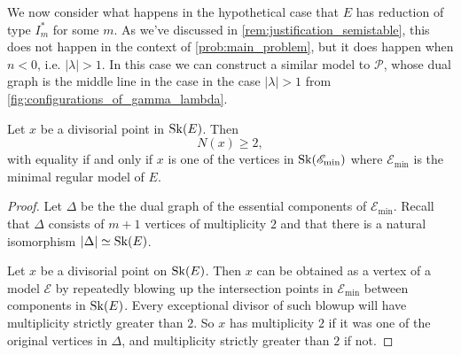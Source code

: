 We now consider what happens in the hypothetical case that $E$ has reduction of type $I_m^*$ for some $m$. 
As we've discussed in \cref{rem:justification_semistable}, this does not happen in the context of \cref{prob:main_problem}, but it does happen when $n < 0$, i.e. $|\lambda| > 1$.  
In this case we can construct a similar model to $\mathscr P$, whose dual graph is the middle line in the case in the case $|\lambda| > 1$ from \cref{fig:configurations_of_gamma_lambda}. 


\begin{lemma}\label{lem:divisorial_points_Is}
	Let $x$ be a divisorial point in $\operatorname{Sk}(E)$. 
	Then  \[
		N(x) \ge 2
	,\] 
	with equality if and only if $x$ is one of the vertices in $\operatorname{Sk}(\mathscr E_\text{min} )$ where $\mathscr E_\text{min} $ is the minimal regular model of $E$. 
\end{lemma}
\begin{proof}
	Let $\Delta$ be the the dual graph of the essential components of $\mathscr E_\text{min} $. 
	Recall that $\Delta$ consists of $m + 1$ vertices of multiplicity $2$ and that there is a natural isomorphism $ |\Delta| \simeq \operatorname{Sk}(E)$. 

	Let $x$ be a divisorial point on $\operatorname{Sk}(E)$.
	Then $x$ can be obtained as a vertex of a model $\mathscr E$ by repeatedly blowing up the intersection points in $\mathscr E_\text{min} $ between components in $\operatorname{Sk}(E)$. 
	Every exceptional divisor of such blowup will have multiplicity strictly greater than $2$. 
	So $x$ has multiplicity $2$ if it was one of the original vertices in $\Delta$, and multiplicity strictly greater than $2$ if not. 
\end{proof}

